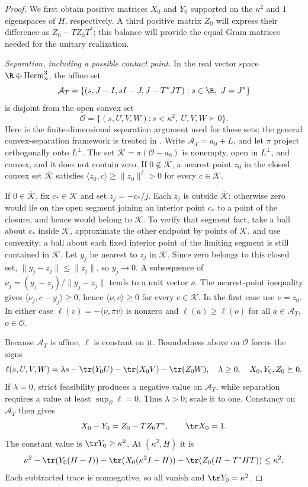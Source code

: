 \begin{proof}
We first obtain positive matrices $X_0$ and $Y_0$ supported on the
$\kappa^2$ and $1$ eigenspaces of $H$, respectively. A third positive
matrix $Z_0$ will express their difference as $Z_0-TZ_0T^*$; this balance
will provide the equal Gram matrices needed for the unitary realization.

\emph{Separation, including a possible contact point.}
In the real vector space $\R\oplus\operatorname{Herm}_n^3$, the affine set
\[
 \mathcal A_T=\{(s,J-I,sI-J,J-T^*JT):s\in\R,\ J=J^*\}
\]
is disjoint from the open convex set
\[
 \mathcal O=\{(s,U,V,W):s<\kappa^2,\ U,V,W\succ0\}.
\]
Here is the finite-dimensional separation argument used for these sets;
the general convex-separation framework is treated in
\cite[Section 11, Theorem 11.2]{Rockafellar1970}.
Write $\mathcal A_T=a_0+L$, and let $\pi$ project orthogonally onto
$L^\perp$. The set $\mathcal K=\pi(\mathcal O-a_0)$ is nonempty, open
in $L^\perp$, and convex, and it does not contain zero. If
$0\notin\overline{\mathcal K}$, a nearest point $z_0$ in the closed convex
set $\overline{\mathcal K}$ satisfies
$\langle z_0,c\rangle\ge\|z_0\|^2>0$ for every $c\in\mathcal K$.

If $0\in\overline{\mathcal K}$, fix $c_*\in\mathcal K$ and set
$z_j=-c_*/j$. Each $z_j$ is outside $\overline{\mathcal K}$: otherwise
zero would lie on the open segment joining an interior point $c_*$ to a
point of the closure, and hence would belong to $\mathcal K$. To verify
that segment fact, take a ball about $c_*$ inside $\mathcal K$, approximate
the other endpoint by points of $\mathcal K$, and use convexity; a ball
about each fixed interior point of the limiting segment is still contained
in $\mathcal K$. Let $y_j$ be nearest to $z_j$ in
$\overline{\mathcal K}$. Since zero belongs to this closed set,
$\|y_j-z_j\|\le\|z_j\|$, so $y_j\to0$. A subsequence of
$\nu_j=(y_j-z_j)/\|y_j-z_j\|$ tends to a unit vector $\nu$.
The nearest-point inequality gives
$\langle\nu_j,c-y_j\rangle\ge0$, hence
$\langle\nu,c\rangle\ge0$ for every $c\in\mathcal K$.
In the first case use $\nu=z_0$. In either case
$\ell(v)=-\langle\nu,\pi v\rangle$ is nonzero and
$\ell(a)\ge\ell(o)$ for all $a\in\mathcal A_T$, $o\in\mathcal O$.

Because $\mathcal A_T$ is affine, $\ell$ is constant on it. Boundedness
above on $\mathcal O$ forces the signs
\[
 \ell(s,U,V,W)=\lambda s-\tr(Y_0U)-\tr(X_0V)-\tr(Z_0W),
 \quad\lambda\ge0,\quad X_0,Y_0,Z_0\succeq0.
\]
If $\lambda=0$, strict feasibility produces a negative value on
$\mathcal A_T$, while separation requires a value at least
$\sup_{\mathcal O}\ell=0$. Thus $\lambda>0$; scale it to one.
Constancy on $\mathcal A_T$ then gives
\begin{equation}\label{eq:dual}
 X_0-Y_0=Z_0-TZ_0T^*,\qquad \tr X_0=1.
\end{equation}
The constant value is $\tr Y_0\ge\kappa^2$. At $(\kappa^2,H)$ it is
\[
 \kappa^2-\tr(Y_0(H-I))-\tr(X_0(\kappa^2I-H))
            -\tr(Z_0(H-T^*HT))\le\kappa^2.
\]
Each subtracted trace is nonnegative, so all vanish and
$\tr Y_0=\kappa^2$.


\end{proof}
